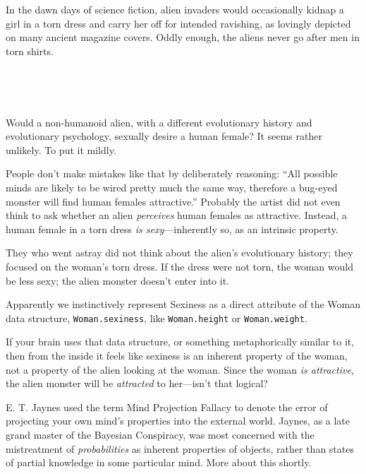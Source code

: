 \myendsectiontext


{
 In the dawn days of science fiction, alien invaders would
occasionally kidnap a girl in a torn dress and carry her off for
intended ravishing, as lovingly depicted on many ancient magazine
covers. Oddly enough, the aliens never go after men in torn shirts.}

{
 ~}

{\centering
{}
 
\par}


\bigskip

{
 ~}

{
 Would a non-humanoid alien, with a different evolutionary history
and evolutionary psychology, sexually desire a human female? It seems
rather unlikely. To put it mildly.}

{
 People don't make mistakes like that by
deliberately reasoning: ``All possible minds are
likely to be wired pretty much the same way, therefore a bug-eyed
monster will find human females attractive.''
Probably the artist did not even think to ask whether an alien
\textit{perceives} human females as attractive. Instead, a human female
in a torn dress \textit{is sexy}{}---inherently so, as an intrinsic
property.}

{
 They who went astray did not think about the
alien's evolutionary history; they focused on the
woman's torn dress. If the dress were not torn, the
woman would be less sexy; the alien monster doesn't
enter into it.}

{
 Apparently we instinctively represent Sexiness as a direct
attribute of the Woman data structure, \texttt{Woman.sexiness}, like
\texttt{Woman.height} or \texttt{Woman.weight}.}

{
 If your brain uses that data structure, or something
metaphorically similar to it, then from the inside it feels like
sexiness is an inherent property of the woman, not a property of the
alien looking at the woman. Since the woman \textit{is attractive}, the
alien monster will be \textit{attracted} to her---isn't
that logical?}

{
 E. T. Jaynes used the term Mind Projection Fallacy to denote the
error of projecting your own mind's properties into the
external world. Jaynes, as a late grand master of the Bayesian
Conspiracy, was most concerned with the mistreatment of
\textit{probabilities} as inherent properties of objects, rather than
states of partial knowledge in some particular mind. More about this
shortly.}

